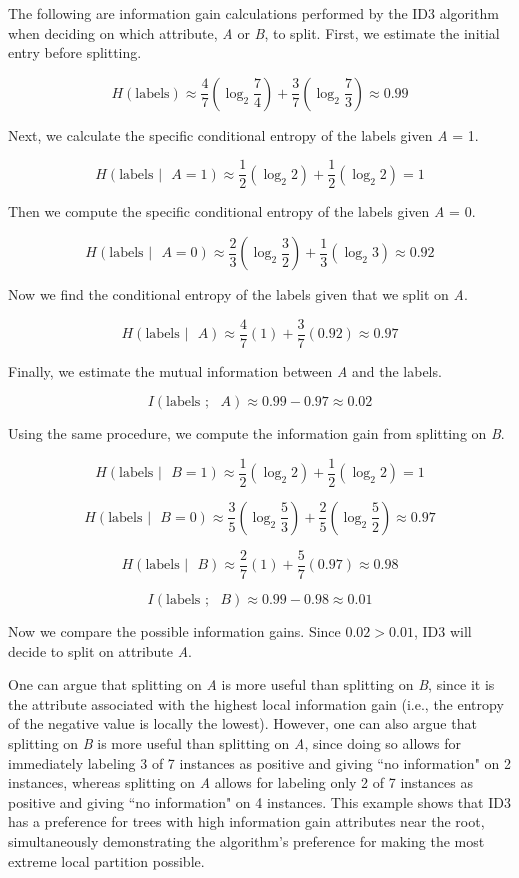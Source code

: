 \documentclass[solution, letterpaper]{cs121}
\begin{document}

\subproblem The following are information gain calculations performed by the ID3 algorithm when deciding on which attribute, \emph{A} or \emph{B}, to split. First, we estimate the initial entry before splitting.

\[ H(\text{labels}) \approx \frac{4}{7} (\log_2 \frac{7}{4}) + \frac{3}{7} (\log_2 \frac{7}{3}) \approx 0.99 \]

Next, we calculate the specific conditional entropy of the labels given \emph{A} = 1.

\[ H(\text{labels } | \text{ } A = 1) \approx \frac{1}{2} (\log_2 2) + \frac{1}{2} (\log_2 2) = 1 \]

Then we compute the specific conditional entropy of the labels given \emph{A} = 0.

\[ H(\text{labels } | \text{ } A = 0) \approx \frac{2}{3} (\log_2 \frac{3}{2}) + \frac{1}{3} (\log_2 3) \approx 0.92 \]

Now we find the conditional entropy of the labels given that we split on \emph{A}.

\[ H(\text{labels } | \text{ } A) \approx \frac{4}{7}(1) + \frac{3}{7}(0.92) \approx 0.97 \]

Finally, we estimate the mutual information between \emph{A} and the labels.

\[ I(\text{labels } ; \text{ } A) \approx  0.99 - 0.97 \approx 0.02\]

Using the same procedure, we compute the information gain from splitting on \emph{B}.

\[ H(\text{labels } | \text{ } B = 1) \approx  \frac{1}{2} (\log_2 2) + \frac{1}{2} (\log_2 2) = 1 \]

\[ H(\text{labels } | \text{ } B = 0) \approx  \frac{3}{5} (\log_2 \frac{5}{3}) + \frac{2}{5} (\log_2 \frac{5}{2}) \approx 0.97 \]

\[ H(\text{labels } | \text{ } B) \approx \frac{2}{7}(1) + \frac{5}{7}(0.97) \approx 0.98 \]

\[ I(\text{labels } ; \text{ } B) \approx  0.99 - 0.98 \approx 0.01 \]

Now we compare the possible information gains. Since $0.02 > 0.01$, ID3 will decide to split on attribute \emph{A}.

One can argue that splitting on \emph{A} is more useful than splitting on \emph{B}, since it is the attribute associated with the highest local information gain (i.e., the entropy of the negative value is locally the lowest). However, one can also argue that splitting on \emph{B} is more useful than splitting on \emph{A}, since doing so allows for immediately labeling 3 of 7 instances as positive and giving  ``no information" on 2 instances, whereas splitting on \emph{A} allows for labeling only 2 of 7 instances as positive and giving ``no information" on 4 instances. This example shows that ID3 has a preference for trees with high information gain attributes near the root, simultaneously demonstrating the algorithm's preference for making the most extreme local partition possible.
\end{document}
